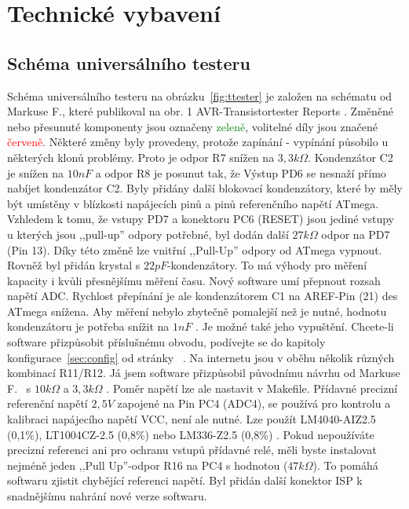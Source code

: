 \chapter{Technické vybavení}

\section{Schéma universálního testeru}
\label{sec:hardware}
Schéma universálního testeru na obrázku~\ref{fig:ttester} je založen na schématu od
Markuse F., které publikoval na obr. 1 AVR-Transistortester Reports \cite{Frejek}.
Změněné nebo přesunuté komponenty jsou označeny \textcolor{green}{zeleně}, volitelné díly jsou
značené \textcolor{red}{červeně}.
Některé změny byly provedeny, protože zapínání - vypínání působilo u některých klonů problémy.
Proto je odpor R7 snížen na \(3,3k\Omega\). 
Kondenzátor C2 je snížen na \(10nF\) a odpor R8 je posunut tak, že
Výstup PD6 se nesnaží přímo nabíjet kondenzátor C2.
Byly přidány další blokovací kondenzátory, které by měly být umístěny v blízkosti napájecích pinů
a pinů referenčního napětí ATmega.
Vzhledem k tomu, že vstupy PD7 a konektoru PC6 (RESET) jsou jediné vstupy u kterých
jsou  ,,pull-up'' odpory potřebné, byl dodán další \(27k\Omega\)  odpor na PD7 (Pin 13).
Díky této změně lze vnitřní  ,,Pull-Up'' odpory od ATmega vypnout.
Rovněž byl přidán krystal s \(22pF\)-kondenzátory.
To má výhody pro měření kapacity i kvůli přesnějšímu měření času.
Nový software umí přepnout rozsah napětí ADC. Rychlost přepínání je ale kondenzátorem C1
na AREF-Pin (21) des ATmega snížena.
Aby měření nebylo zbytečně pomalejší než je nutné, hodnotu kondenzátoru je potřeba snížit na \(1nF\) . 
Je možné také jeho vypuštění.
Chcete-li software přizpůsobit příslušnému obvodu, podívejte se do kapitoly
konfigurace~\ref{sec:config} od stránky~\pageref{sec:config} . 
Na internetu jsou v oběhu několik různých kombinací R11/R12.
Já jsem software přizpůsobil původnímu návrhu od Markuse F.~\cite{Frejek} s \(10k\Omega\) a \(3,3k\Omega\) .
Poměr napětí lze ale nastavit v Makefile.
Přídavné precizní referenční napětí \(2,5V\) zapojené na Pin PC4 (ADC4),
se používá pro kontrolu a kalibraci napájecího napětí VCC, není ale nutné.
Lze použít LM4040-AIZ2.5 (0,1\%), LT1004CZ-2.5 (0,8\%) nebo LM336-Z2.5 (0,8\%) .
Pokud nepoužíváte precizní referenci ani pro ochranu vstupů přídavné relé,
měli byste instalovat nejméně jeden  ,,Pull Up''-odpor R16 na PC4 s hodnotou (\(47k\Omega\)).
To pomáhá softwaru zjistit chybějící referenci napětí.
Byl přidán další konektor ISP k snadnějšímu nahrání nové verze softwaru.

